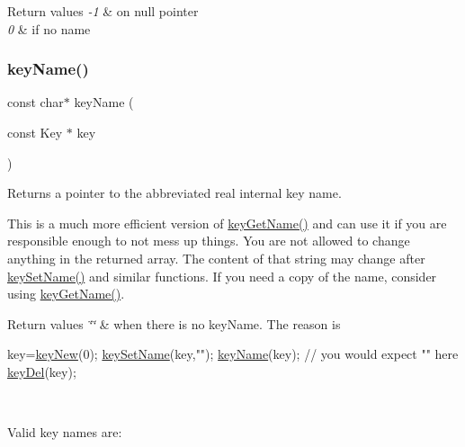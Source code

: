 \begin{DoxyRetVals}{Return values}
{\em -\/1} & on null pointer \\
\hline
{\em 0} & if no name \\
\hline
\end{DoxyRetVals}
\mbox{\label{group__keyname_ga8e805c726a60da921d3736cda7813513}} 
\subsubsection{\texorpdfstring{key\+Name()}{keyName()}}
{\footnotesize\ttfamily const char$\ast$ key\+Name (\begin{DoxyParamCaption}\item[{const Key $\ast$}]{key }\end{DoxyParamCaption})}



Returns a pointer to the abbreviated real internal {\ttfamily key} name. 

This is a much more efficient version of \hyperlink{group__keyname_gab29a850168d9b31c9529e90cf9ab68be}{key\+Get\+Name()} and can use it if you are responsible enough to not mess up things. You are not allowed to change anything in the returned array. The content of that string may change after \hyperlink{group__keyname_ga7699091610e7f3f43d2949514a4b35d9}{key\+Set\+Name()} and similar functions. If you need a copy of the name, consider using \hyperlink{group__keyname_gab29a850168d9b31c9529e90cf9ab68be}{key\+Get\+Name()}.


\begin{DoxyRetVals}{Return values}
{\em \char`\"{}\char`\"{}} & when there is no key\+Name. The reason is 
\begin{DoxyCode}
key=\hyperlink{group__key_gad23c65b44bf48d773759e1f9a4d43b89}{keyNew}(0);
\hyperlink{group__keyname_ga7699091610e7f3f43d2949514a4b35d9}{keySetName}(key,\textcolor{stringliteral}{""});
\hyperlink{group__keyname_ga8e805c726a60da921d3736cda7813513}{keyName}(key); \textcolor{comment}{// you would expect "" here}
\hyperlink{group__key_ga3df95bbc2494e3e6703ece5639be5bb1}{keyDel}(key);
\end{DoxyCode}
\\
\hline
\end{DoxyRetVals}
Valid key names are\+:


